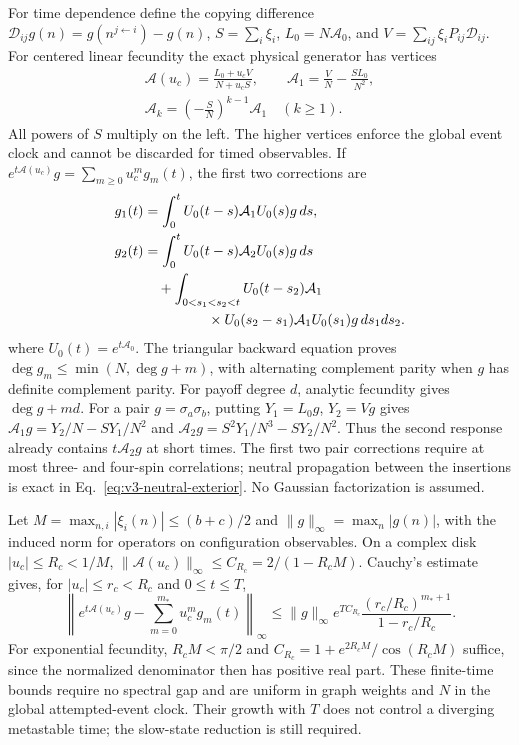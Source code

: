 \documentclass[aps,pre,reprint,amsmath,amssymb,longbibliography]{revtex4-2}
\begin{document}
For time dependence define the copying difference
$\mathcal D_{ij}g(n)=g(n^{j\leftarrow i})-g(n)$,
$S=\sum_i\xi_i$, $L_0=N\mathcal A_0$, and
$V=\sum_{ij}\xi_iP_{ij}\mathcal D_{ij}$.
For centered linear fecundity the exact physical generator has vertices
\begin{equation}
 \begin{gathered}
 \mathcal A(u_c)=\frac{L_0+u_cV}{N+u_cS},\qquad
 \mathcal A_1=\frac VN-\frac{SL_0}{N^2},\\
 \mathcal A_k=\left(-\frac SN\right)^{k-1}\mathcal A_1\quad(k\ge1).
 \end{gathered}
 \label{eq:v3-physical-vertices}
\end{equation}
All powers of $S$ multiply on the left. The higher vertices enforce
the global event clock and cannot be discarded for timed observables.
If $e^{t\mathcal A(u_c)}g=\sum_{m\ge0}u_c^mg_m(t)$, the first two corrections are
\begin{equation}
 \begin{aligned}
 g_1(t)&=\int_0^t U_0(t-s)\mathcal A_1U_0(s)g\,ds,\\
 g_2(t)&=\int_0^t U_0(t-s)\mathcal A_2U_0(s)g\,ds\\
 &\quad+\int_{0<s_1<s_2<t}U_0(t-s_2)\mathcal A_1\\
 &\hspace{16mm}\times U_0(s_2-s_1)\mathcal A_1U_0(s_1)g\,ds_1ds_2.
 \end{aligned}
 \label{eq:v3-physical-duhamel}
\end{equation}
where $U_0(t)=e^{t\mathcal A_0}$. The triangular backward equation proves
$\deg g_m\le\min(N,\deg g+m)$, with alternating complement parity when $g$ has definite complement parity.
For payoff degree $d$, analytic fecundity gives $\deg g+md$.
For a pair $g=\sigma_a\sigma_b$, putting $Y_1=L_0g$, $Y_2=Vg$ gives
$\mathcal A_1g=Y_2/N-SY_1/N^2$ and
$\mathcal A_2g=S^2Y_1/N^3-SY_2/N^2$. Thus the second response already
contains $t\mathcal A_2g$ at short times. The first two pair corrections
require at most three- and four-spin correlations; neutral propagation
between the insertions is exact in Eq.~\eqref{eq:v3-neutral-exterior}.
No Gaussian factorization is assumed.

Let $M=\max_{n,i}|\xi_i(n)|\le(b+c)/2$ and
$\|g\|_\infty=\max_n|g(n)|$, with the induced norm for operators
on configuration observables. On a complex disk
$|u_c|\le R_c<1/M$,
$\|\mathcal A(u_c)\|_\infty\le C_{R_c}=2/(1-R_cM)$.
Cauchy's estimate gives, for $|u_c|\le r_c<R_c$ and $0\le t\le T$,
\begin{equation}
 \left\|e^{t\mathcal A(u_c)}g-\sum_{m=0}^{m_*}u_c^mg_m(t)\right\|_\infty
 \le\|g\|_\infty e^{TC_{R_c}}\frac{(r_c/R_c)^{m_*+1}}{1-r_c/R_c}.
 \label{eq:v3-physical-remainder}
\end{equation}
For exponential fecundity, $R_cM<\pi/2$ and
$C_{R_c}=1+e^{2R_cM}/\cos(R_cM)$ suffice, since the normalized denominator
then has positive real part. These finite-time bounds require no
spectral gap and are uniform in graph weights and $N$ in the global
attempted-event clock. Their growth with $T$ does not control a
diverging metastable time; the slow-state reduction is still required.
\end{document}
